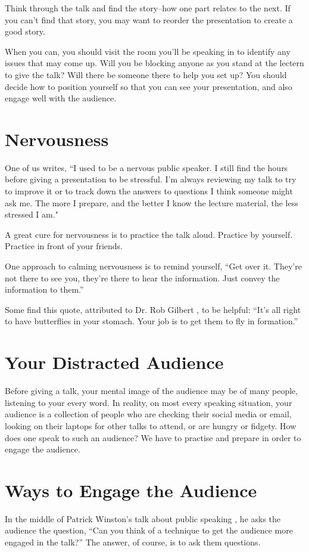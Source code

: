 Think through the talk and find the story--how one part relates to the next.  If you can't find that story, you may want to reorder the presentation to create a good story.

When you can, you should visit the room you'll be speaking in to identify any issues that may come up.  Will you be blocking anyone as you stand at the lectern to give the talk?  Will there be someone there to help you set up?  You should decide how to position yourself so that you can see your presentation, and also engage well with the audience.  


\section{Nervousness}

One of us writes, ``I used to be a nervous public speaker.  I still find the hours before giving a presentation to be stressful. I'm always reviewing my talk to try to improve it or to track down the answers to questions I think someone might ask me.  The more I prepare, and the better I know the lecture material, the less stressed I am."

A great cure for nervousness is to practice the talk aloud. Practice by yourself.  Practice in front of your friends.  

One approach \cite{Hoogterp} to calming  nervousness is to remind yourself, 
``Get over it.  They’re not there to see you, they’re there to hear the information.  Just convey the information to them.''

Some find this quote, attributed to Dr. Rob Gilbert \cite{Gilbert}, to be helpful:
``It's all right to have butterflies in your stomach. Your job is to get them to fly in formation.''

\section{Your Distracted Audience}
Before giving a talk, your mental image of the audience may be of many people, listening to your every word.  In reality, on most every speaking situation, your audience is a collection of people who are checking their social media or email, looking on their laptops for other talks to attend, or are hungry or fidgety.  How does one speak to such an audience?  We have to practise and prepare in order to engage the audience.



\section{Ways to Engage the Audience}
In the middle of Patrick Winston's talk about public speaking \cite{WinstonSpeaks}, he asks the audience the question, ``Can you think of a technique to get the audience more engaged in the talk?''  The answer, of course, is to ask them questions.


